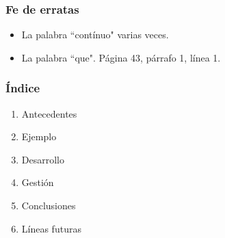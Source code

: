 \begin{frame}
	\frametitle{Fe de erratas}
	
	\begin{itemize}
		\item La palabra ``cont\'inuo" varias veces.
		\item La palabra ``que". P\'agina 43, p\'arrafo 1, l\'inea 1.
	\end{itemize}
\end{frame}

\begin{frame}
	\frametitle{\'Indice}
	\begin{enumerate}
		\item Antecedentes
		\item Ejemplo
		\item Desarrollo
		\item Gesti\'on
		\item Conclusiones
		\item L\'ineas futuras
	\end{enumerate}
\end{frame}

